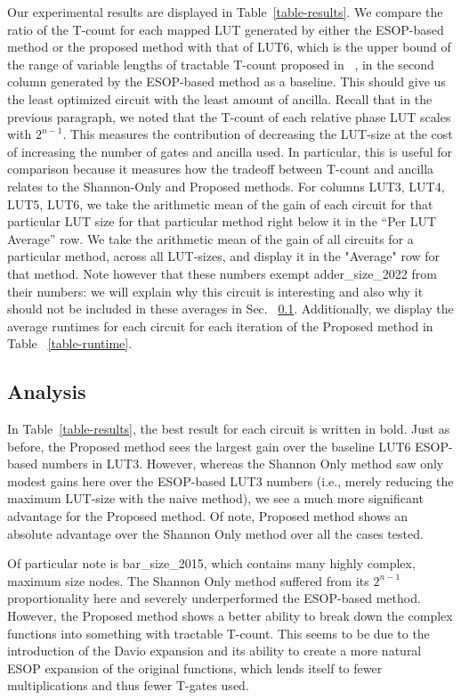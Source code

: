 Our experimental results are displayed in Table~\ref{table-results}. We compare the ratio of the T-count for
each mapped LUT generated by either the ESOP-based method or the proposed method with that of LUT6, which is
the upper bound of the range of variable lengths of tractable T-count proposed in ~\cite{bib-barenco-elementary},
in the second column generated by the ESOP-based method as a baseline.  This should give us the least optimized
circuit with the least amount of ancilla. Recall that in the previous paragraph, we noted that the T-count of each
relative phase LUT scales with $2^{n-1}$. This measures the contribution of decreasing the LUT-size at the cost of
increasing the number of gates and ancilla used. In particular, this is useful for comparison because it measures
how the tradeoff between T-count and ancilla relates to the Shannon-Only and Proposed methods. For columns LUT3, LUT4, LUT5, LUT6,
we take the arithmetic mean of the gain of each circuit for that particular LUT size for that particular
method right below it in the ``Per LUT Average'' row. We take the arithmetic mean of the gain of all circuits for
a particular method, across all LUT-sizes, and display it in the "Average" row for that method. Note however that
these numbers exempt adder\_size\_2022 from their numbers: we will explain why this circuit is interesting and
also why it should not be included in these averages in Sec. ~\ref{Subsec:Analysis}. Additionally, we display
the average runtimes for each circuit for each iteration of the Proposed method in Table ~\ref{table-runtime}.

\subsection{Analysis}
\label{Subsec:Analysis}
In Table~\ref{table-results}, the best result for each circuit is written in bold. Just as before, the
Proposed method sees the largest gain over the baseline LUT6 ESOP-based numbers in LUT3. However, whereas
the Shannon Only method saw only modest gains here over the ESOP-based LUT3 numbers (i.e., merely reducing the
maximum LUT-size with the naive method), we see a much more significant advantage for the Proposed method.
Of note, Proposed method shows an absolute advantage over the Shannon Only method over all the cases tested.

Of particular note is bar\_size\_2015, which contains many highly complex, maximum size nodes. The Shannon Only
method suffered from its $2^{n-1}$ proportionality here and severely underperformed the ESOP-based method.
However, the Proposed method shows a better ability to break down the complex functions into something
with tractable T-count. This seems to be due to the introduction of the Davio expansion and its ability
to create a more natural ESOP expansion of the original functions, which lends itself to fewer multiplications
and thus fewer T-gates used.

